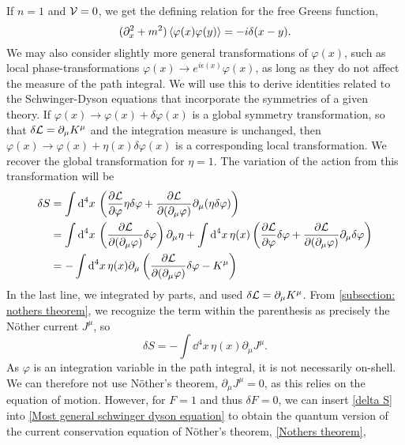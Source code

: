 %
If $n = 1$ and $\mathcal{V} = 0$, we get the defining relation for the free Greens function,
%
\begin{equation}
    (\partial^2_x + m^2)\braket{\varphi(x)\varphi(y)}
    = -i \delta(x - y).
\end{equation}
%
We may also consider slightly more general transformations of $\varphi(x)$, such as local phase-transformations $\varphi(x) \rightarrow e^{i\epsilon(x)}\varphi(x)$, as long as they do not affect the measure of the path integral.
We will use this to derive identities related to the Schwinger-Dyson equations that incorporate the symmetries of a given theory.
If $\varphi(x) \rightarrow \varphi(x) + \delta \varphi(x)$ is a global symmetry transformation, so that $\delta \mathcal{L} = \partial_\mu K^\mu$ and the integration measure is unchanged, then $\varphi(x) \rightarrow \varphi(x) + \eta(x) \delta \varphi(x)$ is a corresponding local transformation.
We recover the global transformation for $\eta = 1$.
The variation of the action from this transformation will be
%
\begin{align}
    \nonumber
    \delta S 
    &= 
    \int \text{d}^4 x \,
    \left(
        \pdv{\mathcal{L}}{\varphi} \eta \delta \varphi
        + \pdv{\mathcal{L}}{(\partial_\mu\varphi) } \partial_\mu (\eta \delta \varphi)
    \right)\\
    \nonumber
    & =
    \int \text{d}^4 x \, \left( \pdv{\mathcal{L}}{(\partial_\mu \varphi)} \delta \varphi \right) \partial_\mu \eta
    + \int \text{d}^4 x \, \eta(x)
    \left( 
        \pdv{\mathcal{L}}{\varphi} \delta \varphi 
        + \pdv{\mathcal{L}}{(\partial_\mu \varphi)} \partial_\mu \delta \varphi  
    \right)\\
    \nonumber
    &=
    - \int \text{d}^4 x \, \eta(x) \partial_\mu 
    \left(  \pdv{\mathcal{L}}{(\partial_\mu \varphi)} \delta \varphi - K^\mu \right)
\end{align}
%
In the last line, we integrated by parts, and used $\delta \mathcal{L} = \partial_\mu K^\mu$.
From \autoref{subsection: nothers theorem}, we recognize the term within the parenthesis as precisely the Nöther current $J^\mu$, so
%
\begin{equation}
    \label{delta S}
    \delta S = - \int \dd^4 x \, \eta(x) \partial_\mu J^\mu.
\end{equation}
%
As $\varphi$ is an integration variable in the path integral, it is not necessarily on-shell.
We can therefore not use Nöther's theorem, $\partial_\mu J^\mu = 0$, as this relies on the equation of motion.
However, for $F = 1$ and thus $\delta F = 0$, we can insert \autoref{delta S} into \autoref{Most general schwinger dyson equation} to obtain the quantum version of the current conservation equation of Nöther's theorem, \autoref{Nothers theorem},
